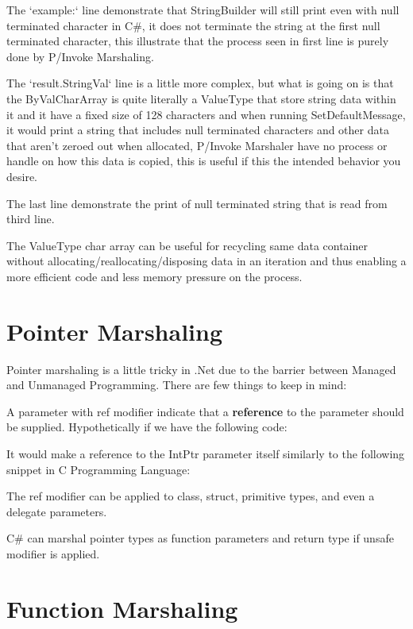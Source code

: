 The `example:` line demonstrate that StringBuilder will still print even with null terminated character in C\#, it does not terminate the string at the first null terminated character, this illustrate that the process seen in first line is purely done by P/Invoke Marshaling.

The `result.StringVal` line is a little more complex, but what is going on is that the ByValCharArray is quite literally a ValueType that store string data within it and it have a fixed size of 128 characters and when running SetDefaultMessage, it would print a string that includes null terminated characters and other data that aren't zeroed out when allocated, P/Invoke Marshaler have no process or handle on how this data is copied, this is useful if this the intended behavior you desire.

The last line demonstrate the print of null terminated string that is read from third line.

The ValueType char array can be useful for recycling same data container without allocating/reallocating/disposing data in an iteration and thus enabling a more efficient code and less memory pressure on the process.

\section{Pointer Marshaling}
Pointer marshaling is a little tricky in .Net due to the barrier between Managed and Unmanaged Programming. There are few things to keep in mind:

A parameter with ref modifier indicate that a \textbf{reference} to the parameter should be supplied. Hypothetically if we have the following code:
\newline


It would make a reference to the IntPtr parameter itself similarly to the following snippet in C Programming Language:
\newline


The ref modifier can be applied to class, struct, primitive types, and even a delegate parameters.

C\# can marshal pointer types as function parameters and return type if unsafe modifier is applied.
\newpage
\section{Function Marshaling}

